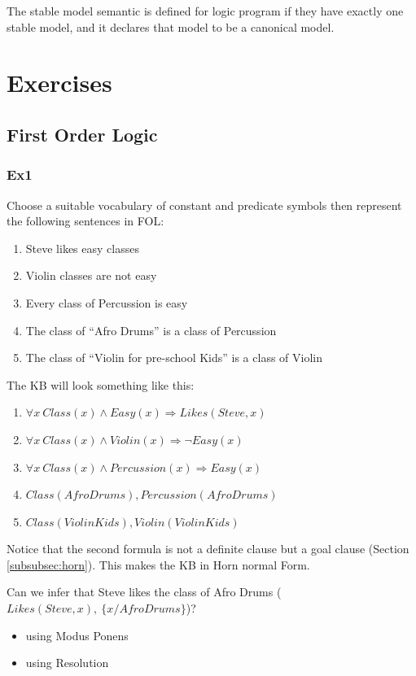 \documentclass[10pt,a4paper]{article}
\newcommand{\changelocaltocdepth}[1]{%
  \addtocontents{toc}{\protect\setcounter{tocdepth}{#1}}%
  \setcounter{tocdepth}{#1}%
}
\begin{document}
\begin{itemize}
The stable model semantic is defined for logic program if they have exactly one stable model, and it declares that model to be a canonical model.




\newpage
\changelocaltocdepth{2}

\section{Exercises}

\subsection{First Order Logic}

\subsubsection{Ex1}
Choose a suitable vocabulary of constant and predicate symbols then represent the following sentences in FOL:
\begin{enumerate}
\item Steve likes easy classes
\item Violin classes are not easy
\item Every class of Percussion is easy
\item The class of “Afro Drums” is a class of Percussion
\item The class of “Violin for pre-school Kids” is a class of Violin
\end{enumerate}
The KB will look something like this:
\begin{enumerate}

\item $\forall x\ Class(x)\wedge Easy(x) \Rightarrow Likes(Steve,x)$
\item $\forall x\ Class(x)\wedge Violin(x) \Rightarrow \neg Easy(x)$
\item $\forall x\ Class(x)\wedge Percussion(x) \Rightarrow Easy(x)$
\item $Class(AfroDrums), Percussion(AfroDrums)$
\item $Class(ViolinKids), Violin(ViolinKids)$

\end{enumerate}
Notice that the second formula is not a definite clause but a goal clause (Section \ref{subsubsec:horn}). This makes the KB in Horn normal Form.


Can we infer that Steve likes the class of Afro Drums ($Likes(Steve,x),\ \{x/AfroDrums\}$)?
\begin{itemize}
\item using Modus Ponens
\item using Resolution
\end{itemize} 



\end{itemize}
\end{document}
